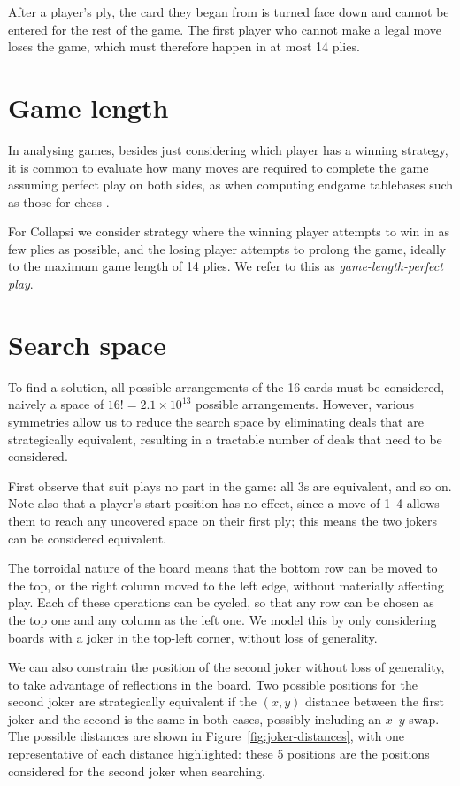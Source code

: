 \documentclass[a4paper, twocolumn]{article}
\begin{document}
After a player's ply, the card they began from is turned face down and cannot
be entered for the rest of the game. The first player who cannot make a legal
move loses the game, which must therefore happen in at most 14 plies.


\section{Game length}

In analysing games, besides just considering which player has a winning
strategy, it is common to evaluate how many moves are required to complete the
game assuming perfect play on both sides, as when computing endgame tablebases
such as those for chess \cite{endgame}.

For Collapsi we consider strategy where the winning player attempts to win in as
few plies as possible, and the losing player attempts to prolong the game,
ideally to the maximum game length of 14 plies. We refer to this as
\textit{game-length-perfect play}.


\section{Search space}

To find a solution, all possible arrangements of the 16 cards must be
considered, naively a space of $16! = 2.1 \times 10^{13}$ possible
arrangements. However, various symmetries allow us to reduce the search space by
eliminating deals that are strategically equivalent, resulting in a tractable
number of deals that need to be considered.

First observe that suit plays no part in the game: all 3s are equivalent, and so
on. Note also that a player's start position has no effect, since a move of 1--4
allows them to reach any uncovered space on their first ply; this means the two
jokers can be considered equivalent.

The torroidal nature of the board means that the bottom row can be moved to the
top, or the right column moved to the left edge, without materially affecting
play. Each of these operations can be cycled, so that any row can be chosen as
the top one and any column as the left one. We model this by only considering
boards with a joker in the top-left corner, without loss of generality.

We can also constrain the position of the second joker without loss of
generality, to take advantage of reflections in the board. Two possible
positions for the second joker are strategically equivalent if the $(x, y)$
distance between the first joker and the second is the same in both cases,
possibly including an $x$--$y$ swap. The possible distances are shown in
Figure~\ref{fig:joker-distances}, with one representative of each distance
highlighted: these 5 positions are the positions considered for the second joker
when searching.
\end{document}
